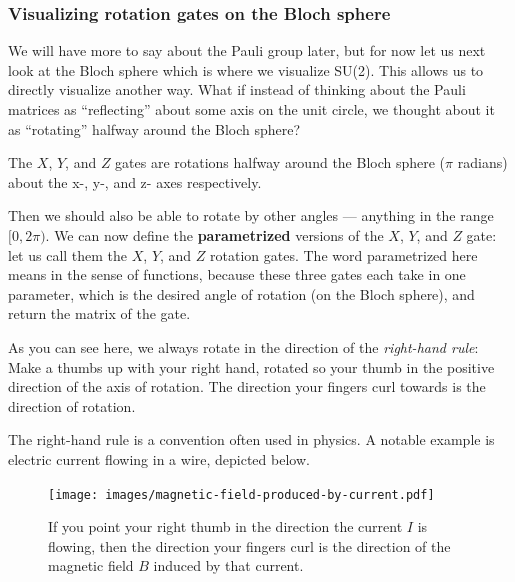\documentclass{article}
\theoremstyle{definition}
\begin{document}
\subsubsection{Visualizing rotation gates on the Bloch sphere}
We will have more to say about the Pauli group later, but for now let us next look at the Bloch sphere which is where we visualize SU(2).
This allows us to directly visualize another way.  What if instead of thinking about the Pauli matrices as ``reflecting'' about some axis on the unit circle, we thought about it as ``rotating'' halfway around the Bloch sphere?

The $X$, $Y$, and $Z$ gates are rotations halfway around the Bloch sphere ($\pi$ radians) about the x-, y-, and z- axes respectively.

Then we should also be able to rotate by other angles --- anything in the range $[0,2\pi)$.
We can now define the \textbf{parametrized} versions of the $X$, $Y$, and $Z$ gate: let us call them the $X$, $Y$, and $Z$ rotation gates.
The word parametrized here means in the sense of functions, because these three gates each take in one parameter, which is the desired angle of rotation (on the Bloch sphere), and return the matrix of the gate.
\begin{figure}[H]
\end{figure}
As you can see here, we always rotate in the direction of the \textit{right-hand rule}: Make a thumbs up with your right hand, rotated so your thumb in the positive direction of the axis of rotation.  The direction your fingers curl towards is the direction of rotation.

The right-hand rule is a convention often used in physics.  A notable example is electric current flowing in a wire, depicted below.
\begin{figure}[H]
    \centering
	\texttt{[image: images/magnetic-field-produced-by-current.pdf]}
	\caption{If you point your right thumb in the direction the current $I$ is flowing, then the direction your fingers curl is the direction of the magnetic field $B$ induced by that current.}
\end{figure}
\end{document}
